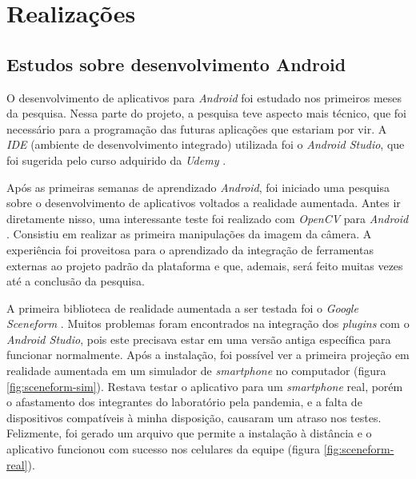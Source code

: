 \chapter{Realizações}\label{chp:realizacoes}

\section{Estudos sobre desenvolvimento Android}

O desenvolvimento de aplicativos para \textit{Android} foi estudado nos primeiros meses da pesquisa. Nessa parte do projeto, a pesquisa teve aspecto mais técnico, que foi necessário para a programação das futuras aplicações que estariam por vir. A \textit{IDE} (ambiente de desenvolvimento integrado) utilizada foi o \textit{Android Studio}, que foi sugerida pelo curso adquirido da \textit{Udemy} \cite{udemy}. 

Após as primeiras semanas de aprendizado \textit{Android}, foi iniciado uma pesquisa sobre o desenvolvimento de aplicativos voltados a realidade aumentada. Antes ir diretamente nisso, uma interessante teste foi realizado com \textit{OpenCV} para \textit{Android} \cite{opencv}. Consistiu em realizar as primeira manipulações da imagem da câmera. A experiência foi proveitosa para o aprendizado da integração de ferramentas externas ao projeto padrão da plataforma e que, ademais, será feito muitas vezes até a conclusão da pesquisa.

A primeira biblioteca de realidade aumentada a ser testada foi o \textit{Google Sceneform} \cite{Sceneform}. Muitos problemas foram encontrados na integração dos \textit{plugins} com o \textit{Android Studio}, pois este precisava estar em uma versão antiga específica para funcionar normalmente. Após a instalação, foi possível ver a primeira projeção em realidade aumentada em um simulador de \textit{smartphone} no computador (figura \ref{fig:sceneform-sim}). Restava testar o aplicativo para um \textit{smartphone} real, porém o afastamento dos integrantes do laboratório pela pandemia, e a falta de dispositivos compatíveis à minha disposição, causaram um atraso nos testes. Felizmente, foi gerado um arquivo que permite a instalação à distância e o aplicativo funcionou com sucesso nos celulares da equipe (figura \ref{fig:sceneform-real}).

